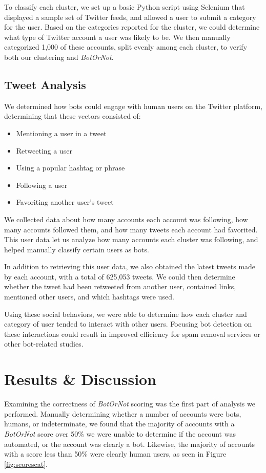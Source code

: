 \documentclass{sig-alternate-05-2015}
\begin{document}
To classify each cluster, we set up a basic Python script using Selenium that displayed a sample set of Twitter feeds, and allowed a user to submit a category for the user. Based on the categories reported for the cluster, we could determine what type of Twitter account a user was likely to be. We then manually categorized 1,000 of these accounts, split evenly among each cluster, to verify both our clustering and \emph{BotOrNot}.

\subsection{Tweet Analysis}

We determined how bots could engage with human users on the Twitter platform, determining that these vectors consisted of:
\begin{itemize}
	\item Mentioning a user in a tweet
	\item Retweeting a user
	\item Using a popular hashtag or phrase
	\item Following a user
	\item Favoriting another user's tweet
\end{itemize}
We collected data about how many accounts each account was following, how many accounts followed them, and how many tweets each account had favorited. This user data let us analyze how many accounts each cluster was following, and helped manually classify certain users as bots.

In addition to retrieving this user data, we also obtained the latest tweets made by each account, with a total of 625,053 tweets. We could then determine whether the tweet had been retweeted from another user, contained links, mentioned other users, and which hashtags were used.

Using these social behaviors, we were able to determine how each cluster and category of user tended to interact with other users. Focusing bot detection on these interactions could result in improved efficiency for spam removal services or other bot-related studies.

\section{Results \& Discussion}

Examining the correctness of \emph{BotOrNot} scoring was the first part of analysis we performed. Manually determining whether a number of accounts were bots, humans, or indeterminate, we found that the majority of accounts with a \emph{BotOrNot} score over 50\% we were unable to determine if the account was automated, or the account was clearly a bot. Likewise, the majority of accounts with a score less than 50\% were clearly human users, as seen in Figure \ref{fig:scorescat}.
\end{document}
